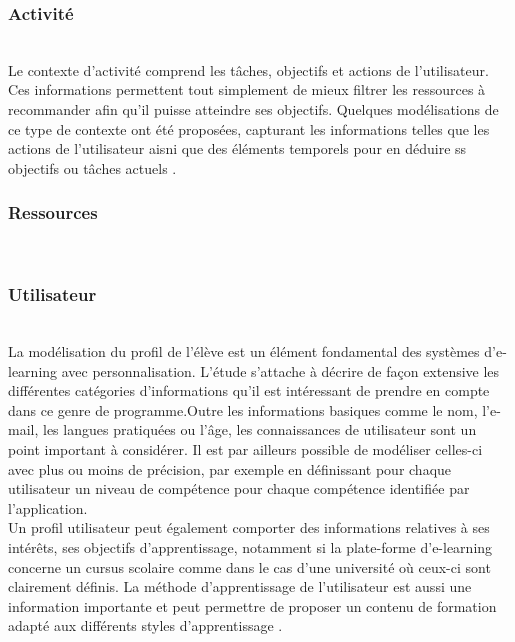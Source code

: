 \documentclass[conference]{./sty/IEEEtran}
\begin{document}
\subsubsection{Activité}
~\\
Le contexte d'activité comprend les tâches, objectifs et actions de l'utilisateur. Ces informations permettent tout simplement de mieux filtrer les ressources à recommander afin qu'il puisse atteindre ses objectifs. Quelques modélisations de ce type de contexte ont été proposées, capturant les informations telles que les actions de l'utilisateur aisni que des éléments temporels pour en déduire ss objectifs ou tâches actuels \cite{DBLP:journals/tlt/VerbertMOWDBD12}.\\

\subsubsection{Ressources}
~\\

\subsubsection{Utilisateur}
~\\
La modélisation du profil de l'élève est un élément fondamental des systèmes
d'e-learning avec personnalisation. L'étude
\cite{DBLP:journals/tlt/VerbertMOWDBD12} s'attache à décrire de façon extensive
les différentes catégories d'informations qu'il est intéressant de prendre en
compte dans ce genre de programme.Outre les informations basiques comme le nom,
l'e-mail, les langues pratiquées ou l'âge, les connaissances de utilisateur sont
un point important à considérer. Il est par ailleurs possible de modéliser
celles-ci avec plus ou moins de précision, par exemple en définissant pour
chaque utilisateur un niveau de compétence pour chaque compétence identifiée
par l'application\cite{DBLP:journals/jucs/SternKHKL10}. \\

Un profil utilisateur peut également comporter des informations relatives à ses
intérêts, ses objectifs d'apprentissage, notamment si la plate-forme
d'e-learning concerne un cursus scolaire comme dans le cas d'une université où
ceux-ci sont clairement définis. La méthode d'apprentissage de l'utilisateur
est aussi une information importante et peut permettre de proposer un contenu
de formation adapté aux différents styles d'apprentissage
\cite{smartECourseRecommander}. \\
\end{document}
